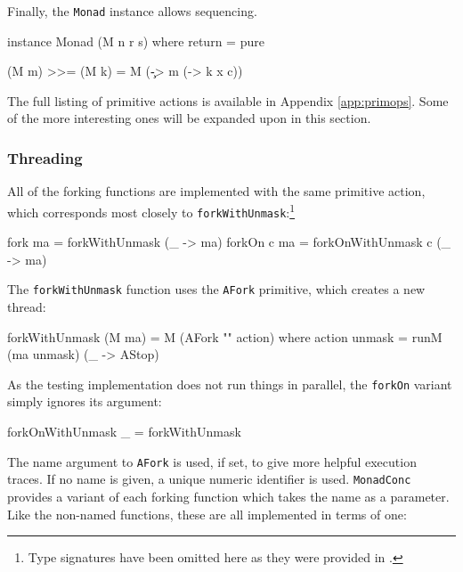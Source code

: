 Finally, the \verb|Monad| instance allows sequencing.

\begin{haskellcode}
instance Monad (M n r s) where
  return = pure

  (M m) >>= (M k) = M (\c -> m (\x -> k x c))
\end{haskellcode}

The full listing of primitive actions is available in Appendix
\ref{app:primops}. Some of the more interesting ones will be expanded
upon in this section.

\subsubsection{Threading}
\label{sec:execution-primops-threading}

All of the forking functions are implemented with the same primitive
action, which corresponds most closely to
\verb|forkWithUnmask|:\footnote{Type signatures have been omitted here
  as they were provided in .}

\begin{haskellcode}
fork     ma = forkWithUnmask     (\_ -> ma)
forkOn c ma = forkOnWithUnmask c (\_ -> ma)
\end{haskellcode}

The \verb|forkWithUnmask| function uses the \verb|AFork| primitive,
which creates a new thread:

\begin{haskellcode}
forkWithUnmask (M ma) = M (AFork "" action) where
  action unmask = runM (ma unmask) (\_ -> AStop)
\end{haskellcode}


As the testing implementation does not run things in parallel, the
\verb|forkOn| variant simply ignores its argument:

\begin{haskellcode}
forkOnWithUnmask _ = forkWithUnmask
\end{haskellcode}

The name argument to \verb|AFork| is used, if set, to give more
helpful execution traces. If no name is given, a unique numeric
identifier is used. \verb|MonadConc| provides a variant of each
forking function which takes the name as a parameter. Like the
non-named functions, these are all implemented in terms of one:

